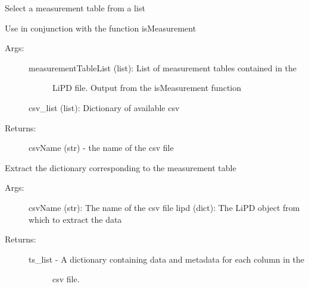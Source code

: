 \documentclass[letterpaper,10pt,english]{sphinxmanual}
\begin{document}
\begin{fulllineitems}
\label{\detokenize{LIPDutils:pyleoclim.LipdUtils.whichMeasurement}}
Select a measurement table from a list

Use in conjunction with the function isMeasurement
\begin{description}
\item[{Args:}] \leavevmode\begin{description}
\item[{measurementTableList (list): List of measurement tables contained in the}] \leavevmode
LiPD file. Output from the isMeasurement function

\end{description}

csv\_list (list): Dictionary of available csv

\item[{Returns:}] \leavevmode
csvName (str) - the name of the csv file

\end{description}

\end{fulllineitems}


\begin{fulllineitems}
\label{\detokenize{LIPDutils:pyleoclim.LipdUtils.getMeasurement}}
Extract the dictionary corresponding to the measurement table
\begin{description}
\item[{Args:}] \leavevmode
csvName (str): The name of the csv file
lipd (dict): The LiPD object from which to extract the data

\item[{Returns:}] \leavevmode\begin{description}
\item[{ts\_list - A dictionary containing data and metadata for each column in the}] \leavevmode
csv file.

\end{description}

\end{description}

\end{fulllineitems}
\end{document}
